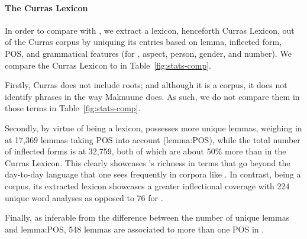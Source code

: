 \paragraph{The Curras Lexicon}

In order to compare \maknuune with \curras, we  extract a lexicon, henceforth Curras Lexicon, out of the Curras corpus by uniquing its entries based on lemma, inflected form, POS, and grammatical features (for \curras, aspect, person, gender, and number). 
We compare the Curras Lexicon to \maknuune in Table~\ref{fig:stats-comp}.

Firstly, Curras does not include  roots; and although it is a corpus, it does not identify phrases in the way Maknuune does. As such, we do not compare them in those terms in Table~\ref{fig:stats-comp}.

Secondly, by virtue of being a lexicon, \maknuune possesses more unique lemmas, weighing in at 17,369 lemmas taking POS into account (lemma:POS), while the total number of inflected forms is at 32,759, both of which are about 50\% more than in the Curras Lexicon. This clearly showcases \maknuune's richness in terms that go beyond the day-to-day language that one sees frequently in corpora like \curras. In contrast, \curras being a corpus, its extracted lexicon showcases a greater inflectional coverage with 224 unique word analyses as opposed to 76 for \maknuune. 

Finally, as inferable from the difference between the number of unique lemmas and lemma:POS, 548 lemmas are associated to more than one POS in \maknuune.

